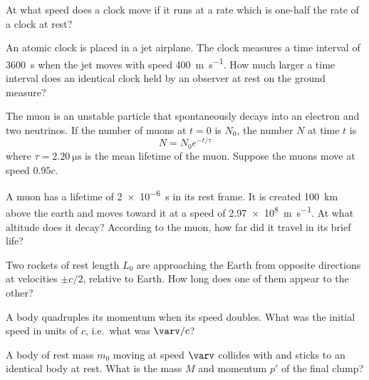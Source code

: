 \documentclass{../../../oss-ap12ibhl}
\begin{document}
\genheader
{}


\begin{questions}
  \question At what speed does a clock move if it runs at a rate which is
  one-half the rate of a clock at rest?

  \question An atomic clock is placed in a jet airplane. The clock measures a
  time interval of \SI{3600}{\second} when the jet moves with speed
  \SI{400}{\metre\per\second}. How much larger a time interval does an
  identical clock held by an observer at rest on the ground measure?

  \question The muon is an unstable particle that spontaneously decays into an
  electron and two neutrinos. If the number of muons at $t=0$ is $N_0$, the
  number $N$ at time $t$ is
  \begin{equation*}
    N = N_0 e^{-t/\tau}
  \end{equation*}
  where $\tau=\SI{2.20}{\micro\second}$ is the mean lifetime of the muon.
  Suppose the muons move at speed $0.95c$.
  \newpage

  \question A muon has a lifetime of \SI{2e-6}{\second} in its rest frame. It
  is created \SI{100}{\kilo\metre} above the earth and moves toward it at
  a speed of \SI{2.97e8}{\metre\per\second}. At what altitude does it decay?
  According to the muon, how far did it travel in its brief life?
  
  \question Two rockets of rest length $L_0$ are approaching the Earth from
  opposite directions at velocities $\pm c/2$, relative to Earth. How long does
  one of them appear to the other?

  \question A body quadruples its momentum when its speed doubles. What was the
  initial speed in units of $c$, i.e.\ what was $\varv/c$?
  \newpage

  \question A body of rest mass $m_0$ moving at speed $\varv$ collides with and
  sticks to an identical body at rest. What is the mass $M$ and momentum
  $p'$ of the final clump?


\end{questions}
\end{document}
